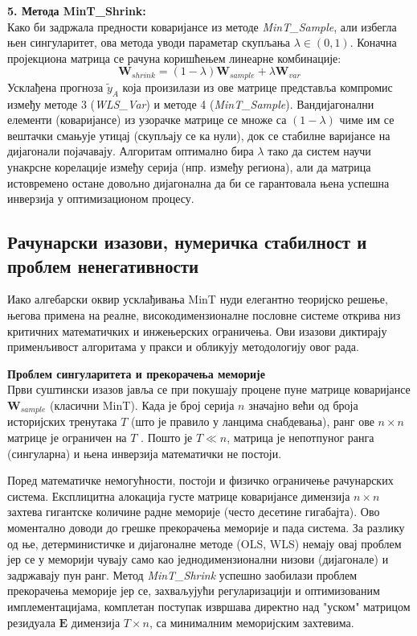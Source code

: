 \documentclass[12pt,oneside]{memoir}
\begin{document}
\vspace{0.5em}
\noindent \textbf{5. Метода MinT\_Shrink:} \\
Како би задржала предности коваријансе из методе \textit{MinT\_Sample}, али избегла њен сингуларитет, ова метода уводи параметар скупљања $\lambda \in (0, 1)$. Коначна пројекциона матрица се рачуна коришћењем линеарне комбинације:
\begin{equation}
    \mathbf{W}_{shrink} = (1-\lambda)\mathbf{W}_{sample} + \lambda\mathbf{W}_{var}
\end{equation}
Усклађена прогноза $\tilde{y}_A$ која произилази из ове матрице представља компромис између методе 3 (\textit{WLS\_Var}) и методе 4 (\textit{MinT\_Sample}). Вандијагонални елементи (коваријансе) из узорачке матрице се множе са $(1-\lambda)$ чиме им се вештачки смањује утицај (скупљају се ка нули), док се стабилне варијансе на дијагонали појачавају. Алгоритам оптимално бира $\lambda$ тако да систем научи унакрсне корелације између серија (нпр. између региона), али да матрица истовремено остане довољно дијагонална да би се гарантовала њена успешна инверзија у оптимизационом процесу.

\subsection{Рачунарски изазови, нумеричка стабилност и проблем ненегативности}

Иако алгебарски оквир усклађивања MinT нуди елегантно теоријско решење, његова примена на реалне, високодимензионалне пословне системе открива низ критичних математичких и инжењерских ограничења. Ови изазови диктирају применљивост алгоритама у пракси и обликују методологију овог рада.

\vspace{1em}
\noindent \textbf{Проблем сингуларитета и прекорачења меморије} \\
Први суштински изазов јавља се при покушају процене пуне матрице коваријансе $\mathbf{W}_{sample}$ (класични MinT). Када је број серија $n$ значајно већи од броја историјских тренутака $T$ (што је правило у ланцима снабдевања), ранг ове $n \times n$ матрице је ограничен на $T$ \cite{wickramasuriya2019optimal}. Пошто је $T \ll n$, матрица је непотпуног ранга (сингуларна) и њена инверзија математички не постоји. 

Поред математичке немогућности, постоји и физичко ограничење рачунарских система. Експлицитна алокација густе матрице коваријансе димензија $n \times n$ захтева гигантске количине радне меморије (често десетине гигабајта). Ово моментално доводи до грешке прекорачења меморије и пада система. За разлику од ње, детерминистичке и дијагоналне методе (OLS, WLS) немају овај проблем јер се у меморији чувају само као једнодимензионални низови (дијагонале) и задржавају пун ранг. Метод \textit{MinT\_Shrink} успешно заобилази проблем прекорачења меморије јер се, захваљујући регуларизацији и оптимизованим имплементацијама, комплетан поступак извршава директно над "уском" матрицом резидуала $\mathbf{E}$ димензија $T \times n$, са минималним меморијским захтевима.
\end{document}
